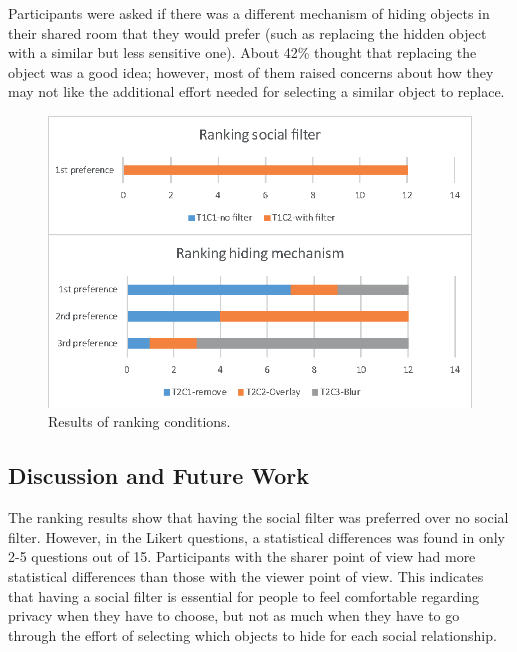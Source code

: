 Participants were asked if there was a different mechanism of hiding objects in their shared room that they would prefer (such as replacing the hidden object with a similar but less sensitive one). About 42\% thought that replacing the object was a good idea; however, most of them raised concerns about how they may not like the additional effort needed for selecting a similar object to replace.

\begin{figure}
\begin{center}
\includegraphics[width=0.8\linewidth]{images/frontier18/images-07.eps}
\caption{Results of ranking conditions.}\label{fig:frontier18:result-ranking}
\end{center}
\end{figure}

\subsection{Discussion and Future Work}

The ranking results show that having the social filter was preferred over no social filter. However, in the Likert questions, a statistical differences was found in only 2-5 questions out of 15. Participants with the sharer point of view had more statistical differences than those with the viewer point of view. This indicates that having a social filter is essential for people to feel comfortable regarding privacy when they have to choose, but not as much when they have to go through the effort of selecting which objects to hide for each social relationship.  


